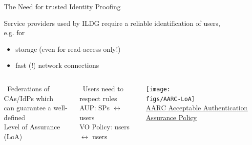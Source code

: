 \documentclass[aspectratio=169,xcolor=dvipsnames]{beamer}
\def\Darrow{\ding{220}}
\newcommand{\bi}{\begin{itemize}}
\newcommand{\ei}{\end{itemize}}
\def\figs{figs3}
\begin{document}
\begin{frame}{The Need for trusted Identity Proofing}

  Service providers used by ILDG \alert{require a reliable identification} of users, \\
  e.g. for
  \bi
  \item storage (even for read-access only!)
  \item fast (!) network connections
  \ei


  \begin{columns}
    \Darrow\ Federations of CAs/IdPs which\\
    \hspace*{5mm} can guarantee a well-defined\\
    \hspace*{5mm}\alert{Level of Assurance} (LoA)

    \vspace*{5mm}
    \Darrow\ Users need to respect rules\\
    \hspace*{5mm} AUP: SPs $\leftrightarrow$ users\\
    \hspace*{5mm} VO Policy: users $\leftrightarrow$ users

    \texttt{[image: \\figs/AARC-LoA]}
    \\
      {\small
        \href{https://docs.google.com/document/d/1BBJYzSCIGlDrV32w-6vNuSdojIlQMf3ObhsYVgG3P6Q}
             {AARC Acceptable Authentication Assurance Policy}
      }
  \end{columns}

  \vfill
\end{frame}
\end{document}
